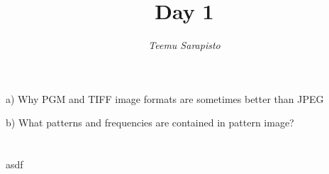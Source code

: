 \documentclass{article}
\begin{document}
\title{Day 1}

\author{\emph{Teemu Sarapisto}}
\maketitle

\newpage

%    
%   
%    

\section{}


a) Why PGM and TIFF image formats are sometimes better than JPEG 

b) What patterns and frequencies are contained in pattern image?

\section{}

asdf

\section{}
\end{document}

